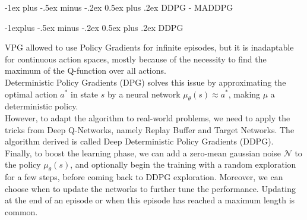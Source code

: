 \documentclass[10pt,landscape]{article}
\makeatletter
\renewcommand{\section}{\@startsection{section}{1}{0mm}%
                                {-1ex plus -.5ex minus -.2ex}%
                                {0.5ex plus .2ex}%
                                {\normalfont\large\bfseries}}
\renewcommand{\subsection}{\@startsection{subsection}{2}{0mm}%
                                {-1explus -.5ex minus -.2ex}%
                                {0.5ex plus .2ex}%
                                {\normalfont\normalsize\bfseries}}
\makeatother
\begin{document}
\begin{multicols}{3}


\section{DDPG - MADDPG}

\subsection{DDPG}

VPG allowed to use Policy Gradients for infinite episodes, but it is inadaptable for continuous action spaces, mostly because of the necessity to find the maximum of the Q-function over all actions.\\
Deterministic Policy Gradients (DPG) solves this issue by approximating the optimal action $a^*$ in state $s$ by a neural network $\mu_\theta(s) \approx a^*$, making $\mu$ a deterministic policy.\\
However, to adapt the algorithm to real-world problems, we need to apply the tricks from Deep Q-Networks, namely Replay Buffer and Target Networks. The algorithm derived is called Deep Deterministic Policy Gradients (DDPG).\\
\medskip
Finally, to boost the learning phase, we can add a zero-mean gaussian noise $\mathcal{N}$ to the policy $\mu_\theta(s)$, and optionally begin the training with a random exploration for a few steps, before coming back to DDPG exploration. Moreover, we can choose when to update the networks to further tune the performance. Updating at the end of an episode or when this episode has reached a maximum length is common.\\



\end{multicols}
\end{document}
